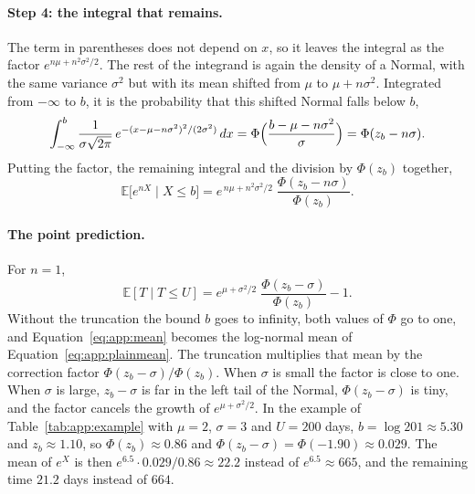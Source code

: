 \paragraph{Step 4: the integral that remains.}
The term in parentheses does not depend on $x$, so it leaves the integral as
the factor $e^{n\mu + n^2\sigma^2/2}$. The rest of the integrand is again the
density of a Normal, with the same variance $\sigma^2$ but with its mean
shifted from $\mu$ to $\mu + n\sigma^2$. Integrated from $-\infty$ to $b$,
it is the probability that this shifted Normal falls below $b$,
\begin{equation}
  \int_{-\infty}^{b} \frac{1}{\sigma\sqrt{2\pi}}\,
  e^{-(x - \mu - n\sigma^2)^2 / (2\sigma^2)}\, dx
  = \Phi\Bigl( \frac{b - \mu - n\sigma^2}{\sigma} \Bigr)
  = \Phi(z_b - n\sigma) .
  \label{eq:app:shifted}
\end{equation}
Putting the factor, the remaining integral and the division by
$\Phi(z_b)$ together,
\begin{equation}
  \mathbb{E}\bigl[ e^{nX} \mid X \le b \bigr]
  = e^{\,n\mu + n^2\sigma^2/2}\; \frac{\Phi(z_b - n\sigma)}{\Phi(z_b)} .
  \label{eq:app:moments}
\end{equation}

\paragraph{The point prediction.}
For $n = 1$,
\begin{equation}
  \mathbb{E}[T \mid T \le U]
  = e^{\mu + \sigma^2/2}\; \frac{\Phi(z_b - \sigma)}{\Phi(z_b)} - 1 .
  \label{eq:app:mean}
\end{equation}
Without the truncation the bound $b$ goes to infinity, both values of $\Phi$
go to one, and Equation~\eqref{eq:app:mean} becomes the log-normal mean of
Equation~\eqref{eq:app:plainmean}. The truncation multiplies that mean by
the correction factor $\Phi(z_b - \sigma) / \Phi(z_b)$. When $\sigma$ is
small the factor is close to one. When $\sigma$ is large, $z_b - \sigma$ is
far in the left tail of the Normal, $\Phi(z_b - \sigma)$ is tiny, and the
factor cancels the growth of $e^{\mu + \sigma^2/2}$. In the example of
Table~\ref{tab:app:example} with $\mu = 2$, $\sigma = 3$ and $U = 200$ days,
$b = \log 201 \approx 5.30$ and $z_b \approx 1.10$, so
$\Phi(z_b) \approx 0.86$ and $\Phi(z_b - \sigma) = \Phi(-1.90) \approx
0.029$. The mean of $e^X$ is then $e^{6.5} \cdot 0.029 / 0.86 \approx 22.2$
instead of $e^{6.5} \approx 665$, and the remaining time $21.2$ days instead
of $664$.

